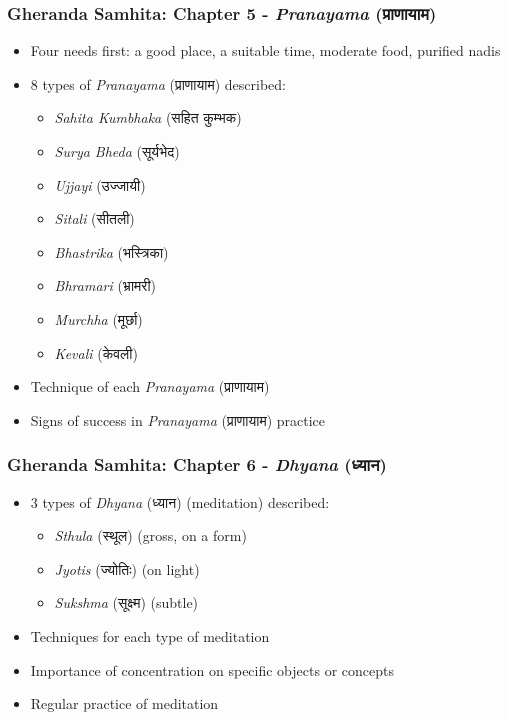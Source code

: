 \begin{frame}[fragile]\frametitle{Gheranda Samhita: Chapter 5 - \textit{Pranayama} (प्राणायाम)}
\begin{itemize}
    \item Four needs first: a good place, a suitable time, moderate food, purified nadis
    \item 8 types of \textit{Pranayama} (प्राणायाम) described:
    \begin{itemize}
        \item \textit{Sahita Kumbhaka} (सहित कुम्भक)
        \item \textit{Surya Bheda} (सूर्यभेद)
        \item \textit{Ujjayi} (उज्जायी)
        \item \textit{Sitali} (सीतली)
        \item \textit{Bhastrika} (भस्त्रिका)
        \item \textit{Bhramari} (भ्रामरी)
        \item \textit{Murchha} (मूर्छा)
        \item \textit{Kevali} (केवली)
    \end{itemize}
    \item Technique of each \textit{Pranayama} (प्राणायाम)
    \item Signs of success in \textit{Pranayama} (प्राणायाम) practice
\end{itemize}
\end{frame}


\begin{frame}[fragile]\frametitle{Gheranda Samhita: Chapter 6 - \textit{Dhyana} (ध्यान)}
\begin{itemize}
    \item 3 types of \textit{Dhyana} (ध्यान) (meditation) described:
    \begin{itemize}
        \item \textit{Sthula} (स्थूल) (gross, on a form)
        \item \textit{Jyotis} (ज्योतिः) (on light)
        \item \textit{Sukshma} (सूक्ष्म) (subtle)
    \end{itemize}
    \item Techniques for each type of meditation
    \item Importance of concentration on specific objects or concepts
    \item Regular practice of meditation
\end{itemize}
\end{frame}

